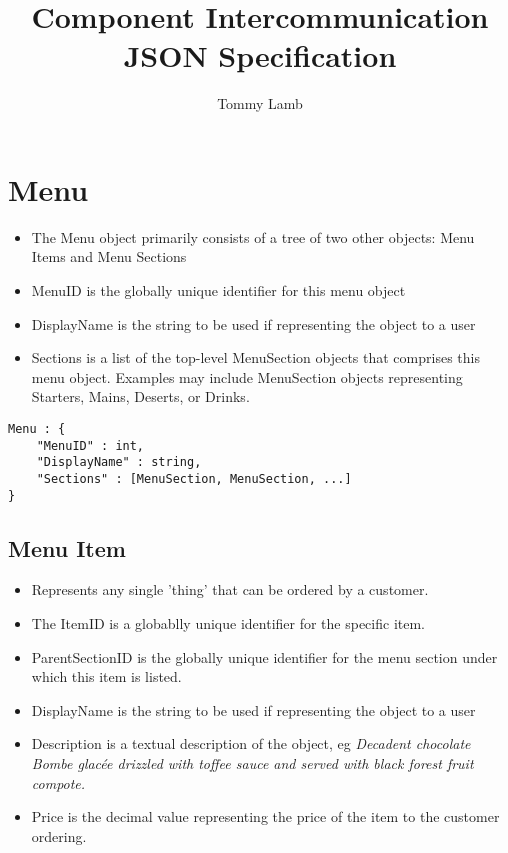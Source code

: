 \documentclass[12pt, a4paper]{article}
\begin{document}
\title{Component Intercommunication JSON Specification}
\author{Tommy Lamb}

\maketitle

\tableofcontents
\pagebreak

\section{Menu}

\begin{itemize}
\item The Menu object primarily consists of a tree of two other objects: Menu Items and Menu Sections %

\item MenuID is the globally unique identifier for this menu object

\item DisplayName is the string to be used if representing the object to a user

\item Sections is a list of the top-level MenuSection objects that comprises this menu object. Examples may include MenuSection objects representing Starters, Mains, Deserts, or Drinks.
\end{itemize}

\begin{verbatim}
Menu : {
	"MenuID" : int,
	"DisplayName" : string,
	"Sections" : [MenuSection, MenuSection, ...]
}
\end{verbatim}


\subsection{Menu Item}

\begin{itemize}
\item Represents any single 'thing' that can be ordered by a customer.
\item The ItemID is a globablly unique identifier for the specific item.
\item ParentSectionID is the globally unique identifier for the menu section under which this item is listed.
\item DisplayName is the string to be used if representing the object to a user
\item Description is a textual description of the object, eg \textit{Decadent chocolate Bombe glacée drizzled with toffee sauce and served with black forest fruit compote.}
\item Price is the decimal value representing the price of the item to the customer ordering.
\end{itemize}
\end{document}
